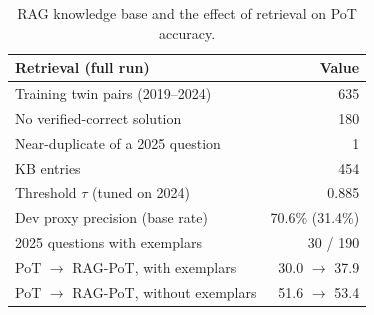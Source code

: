 \begin{table}[t]
\centering
\footnotesize
\caption{RAG knowledge base and the effect of retrieval on PoT accuracy.}
\label{tab:rag}
\setlength{\tabcolsep}{3.5pt}
\begin{tabular}{lr}
\toprule
Retrieval (full run) & Value \\
\midrule
Training twin pairs (2019--2024) & 635 \\
No verified-correct solution & 180 \\
Near-duplicate of a 2025 question & 1 \\
KB entries & 454 \\
Threshold $\tau$ (tuned on 2024) & 0.885 \\
Dev proxy precision (base rate) & 70.6\% (31.4\%) \\
2025 questions with exemplars & 30 / 190 \\
PoT $\to$ RAG-PoT, with exemplars & 30.0 $\to$ 37.9 \\
PoT $\to$ RAG-PoT, without exemplars & 51.6 $\to$ 53.4 \\
\bottomrule
\end{tabular}
\end{table}
